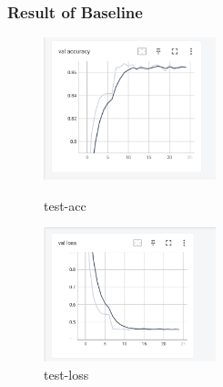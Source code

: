 \documentclass{beamer}
\begin{document}
        \begin{frame}
            \frametitle{Result of Baseline}
            \begin{figure}[H]
                \centering
                \begin{minipage}[t]{0.48\textwidth}
                \centering
                \includegraphics[width=5cm]{./img/val_acc.png}
                \caption{test-acc}
                \end{minipage}
                \begin{minipage}[t]{0.48\textwidth}
                \centering
                \includegraphics[width=5cm]{./img/val_loss.png}
                \caption{test-loss}
                \end{minipage}
            \end{figure}\par
        \end{frame}
\end{document}
